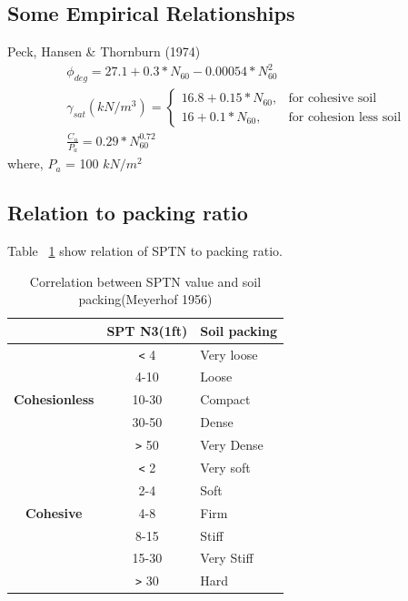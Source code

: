\subsection{Some Empirical Relationships} \label{emp-form}
Peck, Hansen \& Thornburn (1974)\cite{kulhawy_manual_1990}
\begin{gather}
{\phi}_{deg}=27.1+0.3*N_{60}-0.00054*N_{60}^2 \label{phi-form}\\
{\gamma}_{sat}(kN/m^3)= \begin{cases}
    16.8+0.15*N_{60}, & \text{for cohesive soil}\\
    16+0.1*N_{60}, & \text{for cohesion less soil}
    \end{cases}\\
\frac{C_u}{P_a} = 0.29*N_{60}^{0.72} \label{cu-form}
\end{gather}
where, $P_a$ = 100 $kN/m^2$

\subsection{Relation to packing ratio}
Table ~\ref{cbsf-table} show relation of SPT\-N to packing ratio.

\begin{table}
  \centering
  \caption{Correlation between SPT\-N value and soil packing(Meyerhof 1956)}
  \label{cbsf-table}
  \begin{tabular}{|c|c|l|}
  \hline &\bfseries{SPT N3(1ft)} & \bfseries{Soil packing} \\
  \hline \multirow{5}{*}{\begin{sideways}\bfseries{Cohesionless}\end{sideways}} & \verb"<" 4 & Very loose \\
  \cline{2-3} & 4-10 & Loose \\
  \cline{2-3} & 10-30 & Compact \\
  \cline{2-3} & 30-50 & Dense \\
  \cline{2-3} & \verb">" 50 & Very Dense \\
  \hline \multirow{5}{*}{\begin{sideways}\bfseries{Cohesive}\end{sideways}} & \verb"<" 2 & Very soft \\
  \cline{2-3} & 2-4 & Soft \\
  \cline{2-3} & 4-8 & Firm \\
  \cline{2-3} & 8-15 & Stiff \\
  \cline{2-3} & 15-30 & Very Stiff \\
  \cline{2-3} & \verb">" 30 & Hard \\
  \hline 
  \end{tabular}
\end{table}

